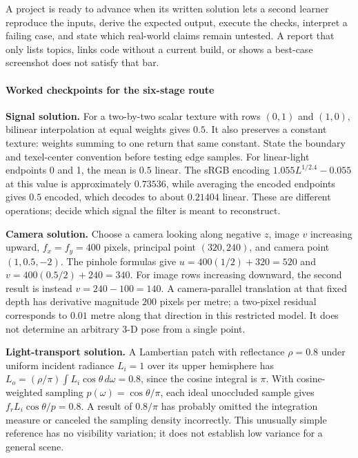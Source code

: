 A project is ready to advance when its written solution lets a second learner reproduce the inputs, derive the expected output, execute the checks, interpret a failing case, and state which real-world claims remain untested. A report that only lists topics, links code without a current build, or shows a best-case screenshot does not satisfy that bar.

\paragraph{Worked checkpoints for the six-stage route}\label{worked-checkpoints-for-the-six-stage-route}

\textbf{Signal solution.} For a two-by-two scalar texture with rows \((0,1)\) and \((1,0)\), bilinear interpolation at equal weights gives \(0.5\). It also preserves a constant texture: weights summing to one return that same constant. State the boundary and texel-center convention before testing edge samples. For linear-light endpoints 0 and 1, the mean is \(0.5\) linear. The sRGB encoding \(1.055L^{1/2.4}-0.055\) at this value is approximately \(0.73536\), while averaging the encoded endpoints gives \(0.5\) encoded, which decodes to about \(0.21404\) linear. These are different operations; decide which signal the filter is meant to reconstruct.

\textbf{Camera solution.} Choose a camera looking along negative \(z\), image \(v\) increasing upward, \(f_x=f_y=400\) pixels, principal point \((320,240)\), and camera point \((1,0.5,-2)\). The pinhole formulas give \(u=400(1/2)+320=520\) and \(v=400(0.5/2)+240=340\). For image rows increasing downward, the second result is instead \(v=240-100=140\). A camera-parallel translation at that fixed depth has derivative magnitude \(200\) pixels per metre; a two-pixel residual corresponds to \(0.01\) metre along that direction in this restricted model. It does not determine an arbitrary 3-D pose from a single point.

\textbf{Light-transport solution.} A Lambertian patch with reflectance \(\rho=0.8\) under uniform incident radiance \(L_i=1\) over its upper hemisphere has \(L_o=(\rho/\pi)\int L_i\cos\theta\,d\omega=0.8\), since the cosine integral is \(\pi\). With cosine-weighted sampling \(p(\omega)=\cos\theta/\pi\), each ideal unoccluded sample gives \(f_rL_i\cos\theta/p=0.8\). A result of \(0.8/\pi\) has probably omitted the integration measure or canceled the sampling density incorrectly. This unusually simple reference has no visibility variation; it does not establish low variance for a general scene.

